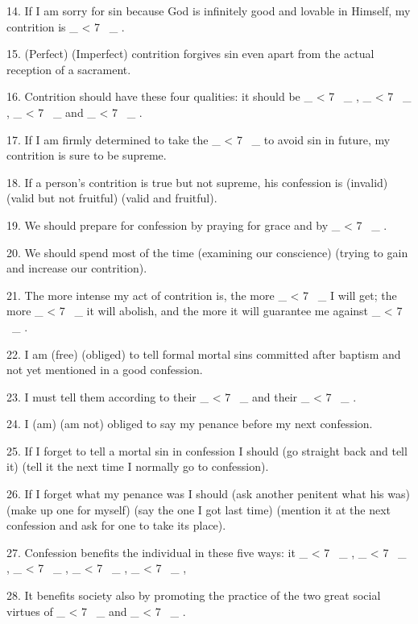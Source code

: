 \documentclass[a5paper]{article}
\newcommand\textjarman[1]{{\jarman #1}}
\newcounter{z}
\newcommand\spaces[1]{ \_\loop \ifnum\value{z} < #1
~\_%
\stepcounter{z}%
\repeat%
\setcounter{z}{0}}
\begin{document}
14. If I am sorry for sin because God is infinitely good and lovable in Himself, my contrition is \spaces{7}.

15. (\textjarman{Perfect}) (\textjarman{Imperfect}) contrition forgives sin even apart from the actual reception of a sacrament.

16. Contrition should have these four qualities: it should be \spaces{7}, \spaces{7}, \spaces{7} and \spaces{7}.

17. If I am firmly determined to take the \spaces{7} to avoid sin in future, my contrition is sure to be supreme.

18. If a person's contrition is true but not supreme, his confession is (\textjarman{invalid}) (\textjarman{valid but not fruitful}) (\textjarman{valid and fruitful}).

19. We should prepare for confession by praying for grace and by \spaces{7}.

20. We should spend most of the time (\textjarman{examining our conscience}) (\textjarman{trying to gain and increase our contrition}).

21. The more intense my act of contrition is, the more \spaces{7} I will get; the more \spaces{7} it will abolish, and the more it will guarantee me against \spaces{7}.

22. I am (\textjarman{free}) (\textjarman{obliged}) to tell formal mortal sins committed after baptism and not yet mentioned in a good confession.

23. I must tell them according to their \spaces{7} and their \spaces{7}.

24. I (\textjarman{am}) (\textjarman{am not}) obliged to say my penance before my next confession.

25. If I forget to tell a mortal sin in confession I should (\textjarman{go straight back and tell it}) (\textjarman{tell it the next time I normally go to confession}).

26. If I forget what my penance was I should (\textjarman{ask another penitent what his was}) (\textjarman{make up one for myself}) (\textjarman{say the one I got last time}) (\textjarman{mention it at the next confession and ask for one to take its place}).

27. Confession benefits the individual in these five ways: it \spaces{7}, \spaces{7}, \spaces{7}, \spaces{7}, \spaces{7},

28. It benefits society also by promoting the practice of the two great social virtues of \spaces{7} and \spaces{7}.
\end{document}
